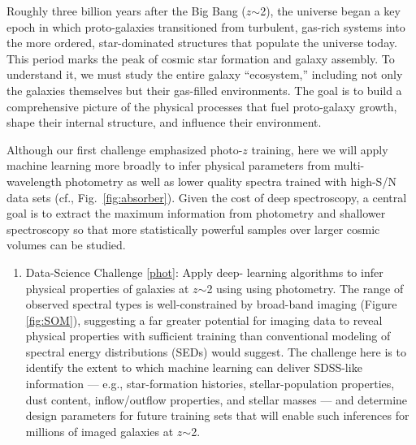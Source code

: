 \documentclass[oneside,11pt]{amsart}
\newcounter{chalno}
\newcommand{\chal}[1]{\refstepcounter{chalno}\label{#1}}
\begin{document}
Roughly three billion years after the Big Bang ($z$$\sim$2), the universe began a key epoch in which proto-galaxies
transitioned from turbulent, gas-rich systems into the more ordered, star-dominated structures that populate the
universe today.  This period marks the peak of cosmic star formation and galaxy assembly.   To understand it, we must
study the entire galaxy ``ecosystem,'' including not only the galaxies themselves but their gas-filled environments.
The goal is to build a comprehensive picture of the physical processes that fuel proto-galaxy growth, shape their
internal structure, and influence their environment.

Although our first challenge emphasized photo-$z$ training, here we will apply machine learning more broadly to infer
physical parameters from multi-wavelength photometry as well as lower quality spectra trained with high-S/N data sets 
(cf., Fig.~\ref{fig:absorber}).  Given the cost of deep spectroscopy, a central goal is to extract the maximum
information from photometry and shallower spectroscopy so that more statistically powerful samples over larger cosmic
volumes can be studied.



\begin{enumerate}[rightmargin=0.2cm,leftmargin=0.2cm]
%
\chal{phot}
%
\item[] {\textsf {\large Data-Science Challenge \ref{phot}: Apply deep-
learning algorithms to infer physical properties of galaxies at
$z$$\sim$2 using using photometry.}} The range of observed spectral
types is well-constrained by broad-band imaging (Figure \ref{fig:SOM}),
suggesting a far greater potential for imaging data to reveal physical
properties with sufficient training than conventional modeling of
spectral energy distributions (SEDs) would suggest.  The challenge here is to identify the extent to which machine
learning can deliver SDSS-like information --- e.g., star-formation histories,
stellar-population properties, dust content, inflow/outflow properties,
and stellar masses --- and determine design parameters for future training sets that will enable such inferences for millions of imaged galaxies at $z$$\sim$2.
%
\end{enumerate}
\end{document}
